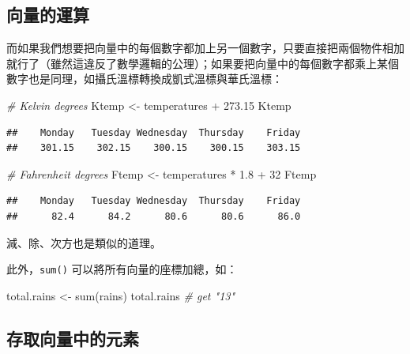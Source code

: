 \documentclass[
]{book}
\newenvironment{Shaded}{\begin{snugshade}}{\end{snugshade}}
\newcommand{\CommentTok}[1]{\textcolor[rgb]{0.56,0.35,0.01}{\textit{#1}}}
\newcommand{\DecValTok}[1]{\textcolor[rgb]{0.00,0.00,0.81}{#1}}
\newcommand{\FloatTok}[1]{\textcolor[rgb]{0.00,0.00,0.81}{#1}}
\newcommand{\FunctionTok}[1]{\textcolor[rgb]{0.00,0.00,0.00}{#1}}
\newcommand{\NormalTok}[1]{#1}
\newcommand{\OtherTok}[1]{\textcolor[rgb]{0.56,0.35,0.01}{#1}}
\newcommand{\SpecialCharTok}[1]{\textcolor[rgb]{0.00,0.00,0.00}{#1}}
\theoremstyle{definition}
\theoremstyle{remark}
\begin{document}
\hypertarget{vectcalc}{%
\subsection{向量的運算}\label{vectcalc}}

而如果我們想要把向量中的每個數字都加上另一個數字，只要直接把兩個物件相加就行了（雖然這違反了數學邏輯的公理）；如果要把向量中的每個數字都乘上某個數字也是同理，如攝氏溫標轉換成凱式溫標與華氏溫標：

\begin{Shaded}
\begin{Highlighting}[]
\CommentTok{\# Kelvin degrees}
\NormalTok{Ktemp }\OtherTok{\textless{}{-}}\NormalTok{ temperatures }\SpecialCharTok{+} \FloatTok{273.15}
\NormalTok{Ktemp}
\end{Highlighting}
\end{Shaded}

\begin{verbatim}
##    Monday   Tuesday Wednesday  Thursday    Friday 
##    301.15    302.15    300.15    300.15    303.15
\end{verbatim}

\begin{Shaded}
\begin{Highlighting}[]
\CommentTok{\# Fahrenheit degrees}
\NormalTok{Ftemp }\OtherTok{\textless{}{-}}\NormalTok{ temperatures }\SpecialCharTok{*} \FloatTok{1.8} \SpecialCharTok{+} \DecValTok{32}
\NormalTok{Ftemp}
\end{Highlighting}
\end{Shaded}

\begin{verbatim}
##    Monday   Tuesday Wednesday  Thursday    Friday 
##      82.4      84.2      80.6      80.6      86.0
\end{verbatim}

減、除、次方也是類似的道理。

此外，\texttt{sum()} 可以將所有向量的座標加總，如：

\begin{Shaded}
\begin{Highlighting}[]
\NormalTok{total.rains }\OtherTok{\textless{}{-}} \FunctionTok{sum}\NormalTok{(rains)}
\NormalTok{total.rains  }\CommentTok{\# get "13"}
\end{Highlighting}
\end{Shaded}

\hypertarget{accesselements}{%
\subsection{存取向量中的元素}\label{accesselements}}
\end{document}
